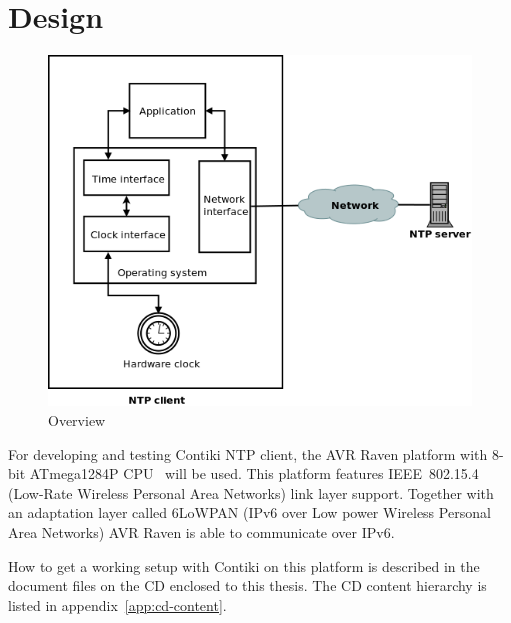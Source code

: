 
\chapter{Design}
\begin{figure}
  \centering
  \includegraphics[width=13cm,keepaspectratio]{fig/design.png}
  \caption{Overview} %
\end{figure}

For developing and testing Contiki NTP client,
the AVR Raven platform with 8-bit ATmega1284P CPU~\cite{avr-datasheet} will be used.
This platform features IEEE~802.15.4 (Low-Rate Wireless Personal Area Networks) link layer support.
Together with an adaptation layer called 6LoWPAN (IPv6 over Low power Wireless Personal Area Networks)
AVR Raven is able to communicate over IPv6.

How to get a working setup with Contiki on this platform is described in
the document files on the CD enclosed to this thesis.
The CD content hierarchy is listed in appendix~\ref{app:cd-content}.








%
